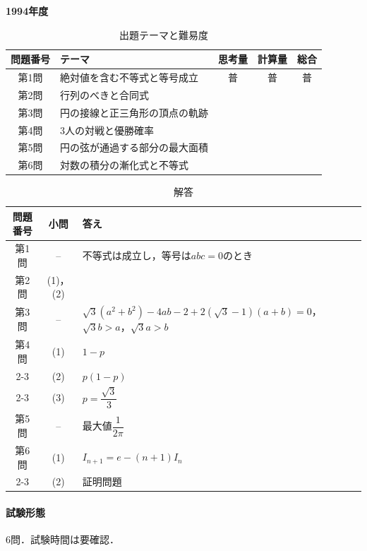 \documentclass[../../main.tex]{subfiles}
\begin{document}
\begin{center}
  {\fontsize{48pt}{58pt}\selectfont \textbf{1994}\normalsize\textbf{年度}}
\end{center}

\begin{table}[htb]
  \centering
  \caption{出題テーマと難易度}
  \begin{tabular}{|c|p{6.2cm}|c|c|c|}
    \hline
    \textbf{問題番号} & \textbf{テーマ} & \textbf{思考量} & \textbf{計算量} & \textbf{総合} \\
    \hline
    第1問 & 絶対値を含む不等式と等号成立 & 普 & 普 & 普 \\
    \hline
    第2問 & 行列のべきと合同式 &  &  &  \\
    \hline
    第3問 & 円の接線と正三角形の頂点の軌跡 &  &  &  \\
    \hline
    第4問 & 3人の対戦と優勝確率 &  &  &  \\
    \hline
    第5問 & 円の弦が通過する部分の最大面積 &  &  &  \\
    \hline
    第6問 & 対数の積分の漸化式と不等式 &  &  &  \\
    \hline
  \end{tabular}
\end{table}

\begin{table}[htb]
  \centering
  \caption{解答}
  \renewcommand{\arraystretch}{1.4}
  \begin{tabular}{|c|c|p{9cm}|}
    \hline
    \textbf{問題番号} & \textbf{小問} & \textbf{答え} \\
    \hline
    第1問 & -- & 不等式は成立し，等号は$abc=0$のとき \\
    \hline
    第2問 & (1)，(2) &  \\
    \hline
    第3問 & -- & $\sqrt{3}(a^2+b^2)-4ab-2+2(\sqrt{3}-1)(a+b)=0$，$\sqrt{3}b>a$，$\sqrt{3}a>b$ \\
    \hline
    第4問 & (1) & $1-p$ \\
    \cline{2-3}
    & (2) & $p(1-p)$ \\
    \cline{2-3}
    & (3) & $p=\dfrac{\sqrt{3}}{3}$ \\
    \hline
    第5問 & -- & 最大値$\dfrac{1}{2\pi}$ \\
    \hline
    第6問 & (1) & $I_{n+1}=e-(n+1)I_n$ \\
    \cline{2-3}
    & (2) & 証明問題 \\
    \hline
  \end{tabular}
\end{table}

\paragraph{試験形態}
6問．試験時間は要確認．
\end{document}
